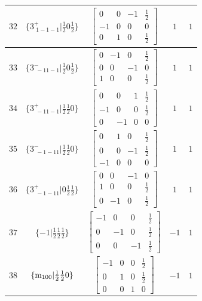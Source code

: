 \documentclass[fleqn,8pt]{jsarticle}
\begin{document}
\begin{longtable}{ccccc}
$ 32 $ & $ \{3^{+}_{\,\,1-1-1}|\frac{1}{2} 0 \frac{1}{2}\} $ & $ \begin{bmatrix} 0 & 0 & -1 & \frac{1}{2} \\ -1 & 0 & 0 & 0 \\ 0 & 1 & 0 & \frac{1}{2} \end{bmatrix} $ & $ 1 $ & $ 1 $ \\ \hline
$ 33 $ & $ \{3^{-}_{\,\,-11-1}|\frac{1}{2} 0 \frac{1}{2}\} $ & $ \begin{bmatrix} 0 & -1 & 0 & \frac{1}{2} \\ 0 & 0 & -1 & 0 \\ 1 & 0 & 0 & \frac{1}{2} \end{bmatrix} $ & $ 1 $ & $ 1 $ \\ \hline
$ 34 $ & $ \{3^{+}_{\,\,-11-1}|\frac{1}{2} \frac{1}{2} 0\} $ & $ \begin{bmatrix} 0 & 0 & 1 & \frac{1}{2} \\ -1 & 0 & 0 & \frac{1}{2} \\ 0 & -1 & 0 & 0 \end{bmatrix} $ & $ 1 $ & $ 1 $ \\ \hline
$ 35 $ & $ \{3^{-}_{\,\,-1-11}|\frac{1}{2} \frac{1}{2} 0\} $ & $ \begin{bmatrix} 0 & 1 & 0 & \frac{1}{2} \\ 0 & 0 & -1 & \frac{1}{2} \\ -1 & 0 & 0 & 0 \end{bmatrix} $ & $ 1 $ & $ 1 $ \\ \hline
$ 36 $ & $ \{3^{+}_{\,\,-1-11}|0 \frac{1}{2} \frac{1}{2}\} $ & $ \begin{bmatrix} 0 & 0 & -1 & 0 \\ 1 & 0 & 0 & \frac{1}{2} \\ 0 & -1 & 0 & \frac{1}{2} \end{bmatrix} $ & $ 1 $ & $ 1 $ \\ \hline
$ 37 $ & $ \{-1|\frac{1}{2} \frac{1}{2} \frac{1}{2}\} $ & $ \begin{bmatrix} -1 & 0 & 0 & \frac{1}{2} \\ 0 & -1 & 0 & \frac{1}{2} \\ 0 & 0 & -1 & \frac{1}{2} \end{bmatrix} $ & $ -1 $ & $ 1 $ \\ \hline
$ 38 $ & $ \{{\rm m}_{100}|\frac{1}{2} \frac{1}{2} 0\} $ & $ \begin{bmatrix} -1 & 0 & 0 & \frac{1}{2} \\ 0 & 1 & 0 & \frac{1}{2} \\ 0 & 0 & 1 & 0 \end{bmatrix} $ & $ -1 $ & $ 1 $ \\ \hline

\end{longtable}
\end{document}
